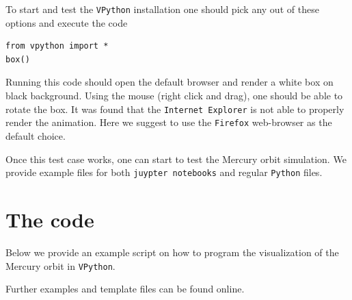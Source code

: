 \documentclass[12pt,ngerman,american]{iopart}
\newcommand{\python}[0]{\texttt{Python}}
\newcommand{\vpython}[0]{\texttt{VPython}}
\begin{document}
To start and test the \vpython{} installation one should pick any out of these options and execute the code
\begin{lstlisting}
from vpython import *
box()
\end{lstlisting}
Running this code should open the default browser and render a white box on black background.
Using the mouse (right click and drag), one should be able to rotate the box.
It was found that the \texttt{Internet Explorer} is not able to properly render the animation.
Here we suggest to use the \texttt{Firefox} web-browser as the default choice.

Once this test case works, one can start to test the Mercury orbit simulation.
We provide example files for both \texttt{juypter notebooks} and regular \python{} files.




\clearpage
\section{The code}\label{sec:code}
Below we provide an example script on how to program the visualization of the Mercury orbit in \vpython{}.

Further examples and template files can be found online\cite{}.
\end{document}
